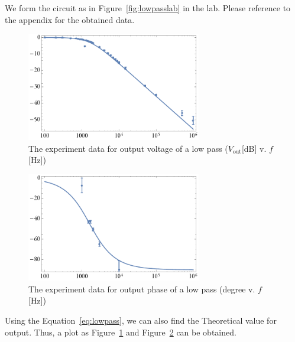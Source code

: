\documentclass[aps,prl,reprint]{revtex4-1}
\begin{document}
        We form the circuit as in Figure~\ref{fig:lowpasslab} in the lab. Please reference to the appendix for the obtained data. 
        \begin{figure}[h]
            \centering
            \includegraphics[width=3in]{image/lowpassvplot.pdf}
            \caption{The experiment data for output voltage of a low pass ($V_\text{out}$[dB] v. $f$[Hz])}
            \label{fig:lowpassvplot}
        \end{figure}
        \begin{figure}[h]
            \centering
            \includegraphics[width=3in]{image/lowpasspplot.pdf}
            \caption{The experiment data for output phase of a low pass (degree v. $f$[Hz])}
            \label{fig:lowpasspplot}
        \end{figure}
        Using the Equation~\ref{eq:lowpass}, we can also find the Theoretical value for output. Thus, a plot as Figure~\ref{fig:lowpassvplot} and Figure~\ref{fig:lowpasspplot} can be obtained.
\end{document}
